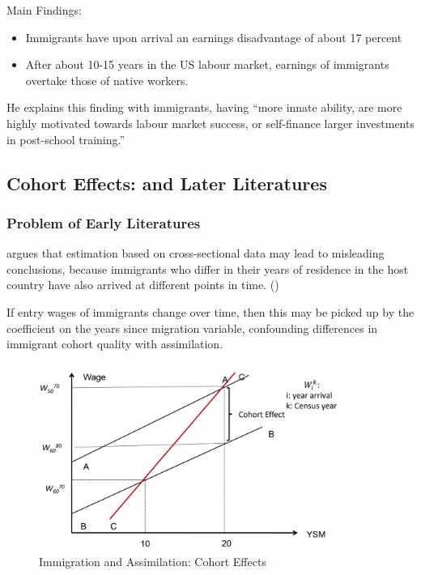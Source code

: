             Main Findings:
            
            \begin{itemize}
                \item Immigrants have upon arrival an earnings disadvantage of about 17 percent
                \item After about 10-15 years in the US labour market, earnings of immigrants overtake those of native workers.
            \end{itemize}
            
            He explains this finding with immigrants, having “more innate ability, are more highly motivated towards labour market success, or self-finance larger investments in post-school training.”

    \subsection{Cohort Effects: \cite{borjas_assimilation_1985} and Later Literatures}

        \subsubsection{Problem of Early Literatures}

            \cite{borjas_assimilation_1985} argues that estimation based on cross-sectional data may lead to misleading conclusions, because immigrants who differ in their years of residence in the host country have also arrived at different points in time. ()
            
            If entry wages of immigrants change over time, then this may be picked up by the coefficient on the years since migration variable, confounding differences in immigrant cohort quality with assimilation.
            
            \begin{figure}[H]
                \centering
                \includegraphics[width=4in]{images/ch11/14.png}
                \caption{Immigration and Assimilation: Cohort Effects}
            \end{figure}

